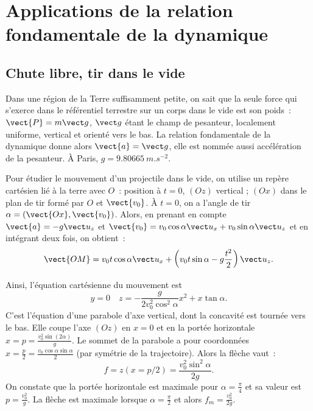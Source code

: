 \chapter{Applications de la relation fondamentale de la dynamique}
\label{chap:applicationsdelarelationfondamentale}
\minitoc
\minilof
\minilot

\section{Chute libre, tir dans le vide}
\label{sec-chap3:chutelibre}

Dans une région de la Terre suffisamment petite, on sait que la seule force qui s'exerce dans le référentiel terrestre sur un corps dans le vide est son poids~: $\vect{P}=m\vg$, $\vg$ étant le champ de pesanteur, localement uniforme, vertical et orienté vers le bas. La relation fondamentale de la dynamique donne alors $\vect{a}=\vg$, elle est nommée aussi accélération de la pesanteur. À Paris, $g=\SI{9.80665}{m.s^{-2}}$.

Pour étudier le mouvement d'un projectile dans le vide, on utilise un repère cartésien lié à la terre avec $O$~: position à $t=0$, $(Oz)$ vertical ; $(Ox)$ dans le plan de tir formé par $O$ et $\vect{v_0}$. À $t=0$, on a l'angle de tir $\alpha = (\vect{Ox}, \vect{v_0})$. Alors, en prenant en compte $\vect{a} = -g\uz$ et $\vect{v_0}= v_0\cos\alpha \ux + v_0\sin\alpha \uz$ et en intégrant deux fois, on obtient~:
\begin{equation}
  \vect{OM} = v_0t\cos \alpha \ux + \left(v_0t\sin\alpha - g\frac{t^2}{2}\right) \uz.
\end{equation}

Ainsi, l'équation cartésienne du mouvement est
\begin{equation}
  y=0 \quad z = -\frac{g}{2v_0^2\cos^2\alpha} x^2 + x\tan\alpha.
\end{equation}
C'est l'équation d'une parabole d'axe vertical, dont la concavité est tournée vers le bas. Elle coupe l'axe $(Oz)$ en $x=0$ et en la portée horizontale $x=p=\frac{v_0^2\sin(2\alpha)}{g}$. Le sommet de la parabole a pour coordonnées $x=\frac{p}{2}=\frac{v_0 \cos\alpha \sin\alpha}{2}$ (par symétrie de la trajectoire). Alors la flèche vaut~:
\begin{equation}
  f=z(x=p/2) = \frac{v_0^2\sin^2\alpha}{2g}.
\end{equation}
On constate que la portée horizontale est maximale pour $\alpha=\frac{\pi}{4}$ et sa valeur est $p=\frac{v_0^2}{g}$. La flèche est maximale lorsque $\alpha=\frac{\pi}{2}$ et alors $f_m = \frac{v_0^2}{2g}$.

